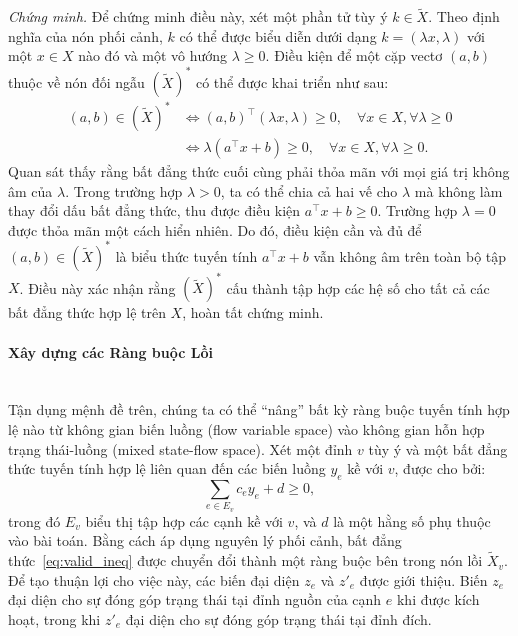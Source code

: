 \textit{Chứng minh.}
Để chứng minh điều này, xét một phần tử tùy ý $k \in \tilde{X}$. Theo định nghĩa của nón phối cảnh, $k$ có thể được biểu diễn dưới dạng $k = (\lambda x, \lambda)$ với một $x \in X$ nào đó và một vô hướng $\lambda \ge 0$. Điều kiện để một cặp vectơ $(a, b)$ thuộc về nón đối ngẫu $(\tilde{X})^*$ có thể được khai triển như sau:
\begin{align}
    (a, b) \in (\tilde{X})^* &\iff (a, b)^\top (\lambda x, \lambda) \ge 0, \quad \forall x \in X, \forall \lambda \ge 0 \nonumber \\
    &\iff \lambda (a^\top x + b) \ge 0, \quad \forall x \in X, \forall \lambda \ge 0.
\end{align}
Quan sát thấy rằng bất đẳng thức cuối cùng phải thỏa mãn với mọi giá trị không âm của $\lambda$. Trong trường hợp $\lambda > 0$, ta có thể chia cả hai vế cho $\lambda$ mà không làm thay đổi dấu bất đẳng thức, thu được điều kiện $a^\top x + b \ge 0$. Trường hợp $\lambda = 0$ được thỏa mãn một cách hiển nhiên. Do đó, điều kiện cần và đủ để $(a, b) \in (\tilde{X})^*$ là biểu thức tuyến tính $a^\top x + b$ vẫn không âm trên toàn bộ tập $X$. Điều này xác nhận rằng $(\tilde{X})^*$ cấu thành tập hợp các hệ số cho tất cả các bất đẳng thức hợp lệ trên $X$, hoàn tất chứng minh.

\paragraph{Xây dựng các Ràng buộc Lồi}\mbox{}\\

Tận dụng mệnh đề trên, chúng ta có thể ``nâng'' bất kỳ ràng buộc tuyến tính hợp lệ nào từ không gian biến luồng (flow variable space) vào không gian hỗn hợp trạng thái-luồng (mixed state-flow space). Xét một đỉnh $v$ tùy ý và một bất đẳng thức tuyến tính hợp lệ liên quan đến các biến luồng $y_e$ kề với $v$, được cho bởi:
\begin{equation}
    \sum_{e \in E_v} c_e y_e + d \ge 0, \label{eq:valid_ineq}
\end{equation}
trong đó $E_v$ biểu thị tập hợp các cạnh kề với $v$, và $d$ là một hằng số phụ thuộc vào bài toán. Bằng cách áp dụng nguyên lý phối cảnh, bất đẳng thức~\eqref{eq:valid_ineq} được chuyển đổi thành một ràng buộc bên trong nón lồi $\tilde{X}_v$. Để tạo thuận lợi cho việc này, các biến đại diện $z_e$ và $z'_e$ được giới thiệu. Biến $z_e$ đại diện cho sự đóng góp trạng thái tại đỉnh nguồn của cạnh $e$ khi được kích hoạt, trong khi $z'_e$ đại diện cho sự đóng góp trạng thái tại đỉnh đích.

